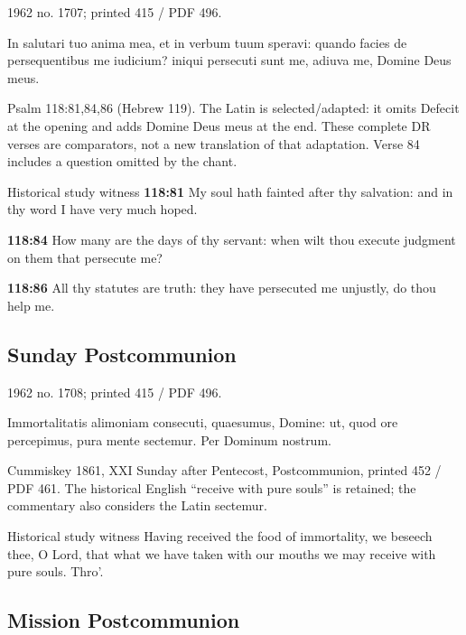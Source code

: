 1962 no. 1707; printed 415 / PDF 496.

\begin{latinproper}
In salutari tuo anima mea, et in verbum tuum speravi: quando facies de persequentibus me iudicium? iniqui persecuti sunt me, adiuva me, Domine Deus meus.
\end{latinproper}

Psalm 118:81,84,86 (Hebrew 119). The Latin is selected/adapted: it omits Defecit at the opening and adds Domine Deus meus at the end. These complete DR verses are comparators, not a new translation of that adaptation. Verse 84 includes a question omitted by the chant.

\begin{englishwitness}{Historical study witness}
\textbf{118:81} My soul hath fainted after thy salvation: and in thy word I have very much hoped.

\textbf{118:84} How many are the days of thy servant: when wilt thou execute judgment on them that persecute me?

\textbf{118:86} All thy statutes are truth: they have persecuted me unjustly, do thou help me.
\end{englishwitness}

\subsection{Sunday Postcommunion}
\label{proper-postcommunion}

1962 no. 1708; printed 415 / PDF 496.

\begin{latinproper}
Immortalitatis alimoniam consecuti, quaesumus, Domine: ut, quod ore percepimus, pura mente sectemur. Per Dominum nostrum.
\end{latinproper}

Cummiskey 1861, XXI Sunday after Pentecost, Postcommunion, printed 452 / PDF 461. The historical English “receive with pure souls” is retained; the commentary also considers the Latin sectemur.

\begin{englishwitness}{Historical study witness}
Having received the food of immortality, we beseech thee, O Lord, that what we have taken with our mouths we may receive with pure souls. Thro’.
\end{englishwitness}

\subsection{Mission Postcommunion}
\label{proper-mission-postcommunion}


